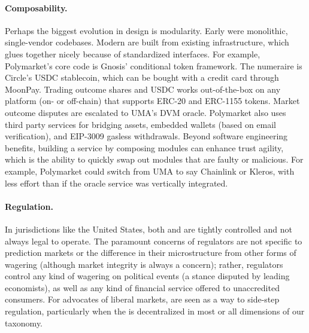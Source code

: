 \paragraph{Composability.} Perhaps the biggest evolution in \depm design is modularity. Early \depms were monolithic, single-vendor codebases. Modern \depms are built from existing infrastructure, which glues together nicely because of standardized interfaces. For example, Polymarket's core \depm code is Gnosis' conditional token framework. The numeraire is Circle's USDC stablecoin, which can be bought with a credit card through MoonPay. Trading outcome shares and USDC works out-of-the-box on any platform (on- or off-chain) that supports ERC-20 and ERC-1155 tokens. Market outcome disputes are escalated to UMA's DVM oracle. Polymarket also uses third party services for bridging assets, embedded wallets (based on email verification), and EIP-3009 gasless withdrawals. Beyond software engineering benefits, building a service by composing modules can enhance trust agility, which is the ability to quickly swap out modules that are faulty or malicious. For example, Polymarket could switch from UMA to say Chainlink or Kleros, with less effort than if the oracle service was vertically integrated. 

\paragraph{Regulation.} In jurisdictions like the United States, both \cepms and \depms are tightly controlled and not always legal to operate. The paramount concerns of regulators are not specific to prediction markets or the difference in their microstructure from other forms of wagering (although market integrity is always a concern); rather, regulators control any kind of wagering on political events (a stance disputed by leading economists), as well as any kind of financial service offered to unaccredited consumers. For advocates of liberal markets, \depms are seen as a way to side-step regulation, particularly when the \depm is decentralized in most or all dimensions of our taxonomy. 





